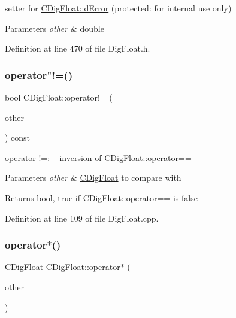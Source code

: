 setter for \hyperlink{classCDigFloat_a25eb3782d1e727ff007a48f8308e3d4d}{C\+Dig\+Float\+::d\+Error} (protected\+: for internal use only) 


\begin{DoxyParams}{Parameters}
{\em other} & double \\
\hline
\end{DoxyParams}


Definition at line 470 of file Dig\+Float.\+h.

\mbox{\label{classCDigFloat_a15c13c035aff8184491bd9629403a33a}} 
\subsubsection{\texorpdfstring{operator"!=()}{operator!=()}}
{\footnotesize\ttfamily bool C\+Dig\+Float\+::operator!= (\begin{DoxyParamCaption}\item[{const \hyperlink{classCDigFloat}{C\+Dig\+Float} \&}]{other }\end{DoxyParamCaption}) const}



operator !=\+: ~\newline
 inversion of \hyperlink{classCDigFloat_ad8980d984bf2bab71d15b830fd0180a5}{C\+Dig\+Float\+::operator==} 


\begin{DoxyParams}{Parameters}
{\em other} & \hyperlink{classCDigFloat}{C\+Dig\+Float} to compare with \\
\hline
\end{DoxyParams}
\begin{DoxyReturn}{Returns}
bool, true if \hyperlink{classCDigFloat_ad8980d984bf2bab71d15b830fd0180a5}{C\+Dig\+Float\+::operator==} is false 
\end{DoxyReturn}


Definition at line 109 of file Dig\+Float.\+cpp.

\mbox{\label{classCDigFloat_a79029fee4d38f893d72209e7d6eb89ed}} 
\subsubsection{\texorpdfstring{operator$\ast$()}{operator*()}\hspace{0.1cm}{\footnotesize\ttfamily [1/2]}}
{\footnotesize\ttfamily \hyperlink{classCDigFloat}{C\+Dig\+Float} C\+Dig\+Float\+::operator$\ast$ (\begin{DoxyParamCaption}\item[{const \hyperlink{classCDigFloat}{C\+Dig\+Float} \&}]{other }\end{DoxyParamCaption})}



